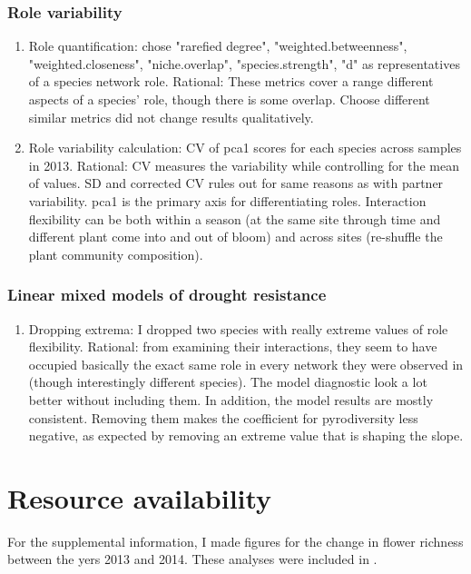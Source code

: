 \documentclass{article}\usepackage[]{graphicx}\usepackage[]{color}
\begin{document}
\subsubsection{Role variability}
\begin{enumerate}
\item Role quantification: chose "rarefied degree",
  "weighted.betweenness", "weighted.closeness", "niche.overlap",
  "species.strength", "d" as representatives of a species network
  role. Rational: These metrics cover a range different aspects of a
  species' role, though there is some overlap. Choose different
  similar metrics did not change results qualitatively.
\item Role variability calculation: CV of pca1 scores for each species
  across samples in 2013. Rational: CV measures the variability while
  controlling for the mean of values. SD and corrected CV rules out
  for same reasons as with partner variability. pca1 is the primary
  axis for differentiating roles. Interaction flexibility can be both
  within a season (at the same site through time and different plant
  come into and out of bloom) and across sites (re-shuffle the plant
  community composition).
\end{enumerate}

\subsubsection{Linear mixed models of drought resistance}
\begin{enumerate}
\item Dropping extrema: I dropped two species with really extreme
  values of role flexibility. Rational: from examining their
  interactions, they seem to have occupied basically the exact same
  role in every network they were observed in (though interestingly
  different species). The model diagnostic look a lot better without
  including them. In addition, the model results are mostly
  consistent. Removing them makes the coefficient for pyrodiversity
  less negative, as expected by removing an extreme value that is
  shaping the slope.
  \end{enumerate}

  

\section{Resource availability}
  \label{sec:resource}
  For the supplemental information, I made figures for the change in
  flower richness between the yers 2013 and 2014. These analyses were
  included in \citep{ponisio2016pyrodiversity}.


\clearpage

\clearpage
\end{document}

